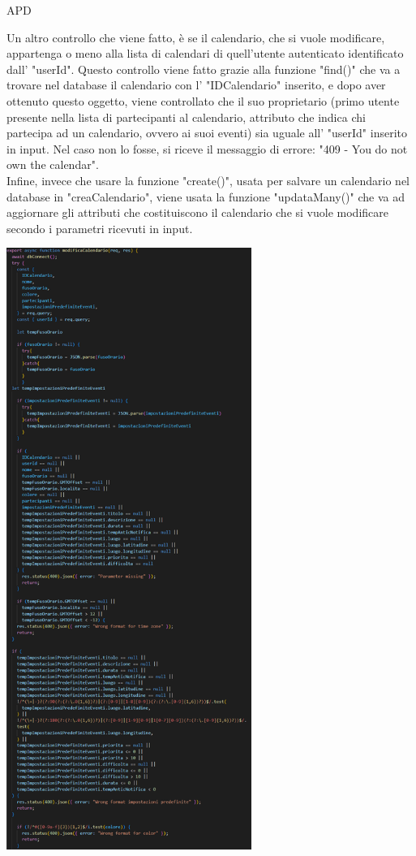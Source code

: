 \begin{listaPersonale} {APD}
\begin{listaPersonale2}[APD]{}
                Un altro controllo che viene fatto, è se il calendario, che si vuole modificare, appartenga o meno alla lista di calendari di quell'utente autenticato identificato dall' "userId". Questo controllo viene fatto grazie alla funzione "find()" che va a trovare nel database il calendario con l' "IDCalendario" inserito, e dopo aver ottenuto questo oggetto, viene controllato che il suo proprietario (primo utente presente nella lista di partecipanti al calendario, attributo che indica chi partecipa ad un calendario, ovvero ai suoi eventi) sia uguale all' "userId" inserito in input. Nel caso non lo fosse, si riceve il messaggio di errore: "409 - You do not own the calendar". \\
                Infine, invece che usare la funzione "create()", usata per salvare un calendario nel database in "creaCalendario", viene usata la funzione "updataMany()" che va ad aggiornare gli attributi che costituiscono il calendario che si vuole modificare secondo i parametri ricevuti in input.
                \begin{center}
                    \includegraphics[width=0.6\textwidth, height=0.9\textheight]{img/png/APIs/modificaCalendario.png}

\end{center}
\end{listaPersonale2}
\end{listaPersonale}

